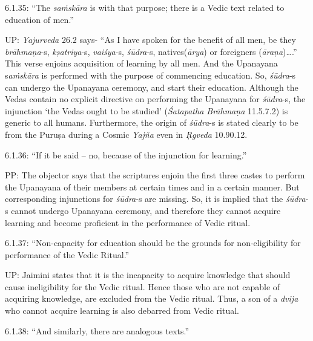 6.1.35: “The \textit{saṁskāra} is with that purpose; there is a Vedic text related to education of men.”

UP: \textit{Yajurveda} 26.2 says- “As I have spoken for the benefit of all men, be they \textit{brāhmaṇa}-s, \textit{kṣatriya}-s, \textit{vaiśya}-s, \textit{śūdra}-s, natives(\textit{ārya}) or foreigners (\textit{āraṇa})….” This verse enjoins acquisition of learning by all men. And the Upanayana s\textit{aṁskāra} is performed with the purpose of commencing education. So, \textit{śūdra}-s can undergo the Upanayana ceremony, and start their education. Although the Vedas contain no explicit directive on performing the Upanayana for \textit{śūdra}-s, the injunction ‘the Vedas ought to be studied’ (\textit{Śatapatha Brāhmaṇa} 11.5.7.2) is generic to all humans. Furthermore, the origin of \textit{śūdra}-s is stated clearly to be from the Puruṣa during a Cosmic \textit{Yajña} even in \textit{Ṛgveda} 10.90.12.

6.1.36: “If it be said – no, because of the injunction for learning.”

PP: The objector says that the scriptures enjoin the first three castes to perform the Upanayana of their members at certain times and in a certain manner. But corresponding injunctions for \textit{śūdra}-s are missing. So, it is implied that the \textit{śūdra}-s cannot undergo Upanayana ceremony, and therefore they cannot acquire learning and become proficient in the performance of Vedic ritual.

6.1.37: “Non-capacity for education should be the grounds for non-eligibility for performance of the Vedic Ritual.”

UP: Jaimini states that it is the incapacity to acquire knowledge that should cause ineligibility for the Vedic ritual. Hence those who are not capable of acquiring knowledge, are excluded from the Vedic ritual. Thus, a son of a \textit{dvija }who cannot acquire learning is also debarred from Vedic ritual.

6.1.38: “And similarly, there are analogous texts.”

